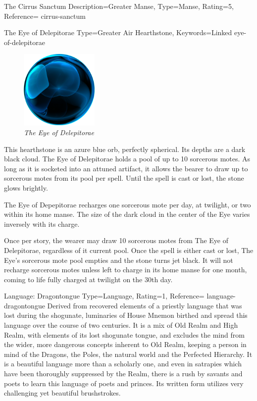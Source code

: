 \begin{Merit}{The Cirrus Sanctum}{%
    Description=Greater Manse,
    Type=Manse,
    Rating=5,
    Reference=\cite*[p.~163]{ex3}
}{cirrus-sanctum}
    \begin{Hearthstone}{The Eye of Delepitorae}{%
        Type=Greater Air Hearthstone,
        Keywords=Linked
    }{eye-of-delepitorae}
        \begin{figure}[b]
            \centering
            \includegraphics[height=1.5in]{Hearthstone.png}
            \caption*{\itshape The Eye of Delepitorae}
        \end{figure}
        This hearthstone is an azure blue orb, perfectly spherical. Its depths
        are a dark black cloud. The Eye of Delepitorae holds a pool of up to 10
        sorcerous motes. As long as it is socketed into an attuned artifact,
        it allows the bearer to draw up to  sorcerous
        motes from its pool per spell. Until the spell is cast or lost, the
        stone glows brightly.

        The Eye of Depepitorae recharges one sorcerous mote per day, at twilight,
        or two within its home manse. The size of the dark cloud in the center
        of the Eye varies inversely with its charge.

        Once per story, the wearer may draw 10 sorcerous motes from The Eye of
        Delepitorae, regardless of it current pool. Once the spell is either cast
        or lost, The Eye's sorcerous mote pool empties and the stone turns jet
        black. It will not recharge sorcerous motes unless left to charge in
        its home manse for one month, coming to life fully charged at twilight
        on the 30th day.
    \end{Hearthstone}
\end{Merit}


\begin{Merit}{Language: Dragontongue}{%
    Type=Language,
    Rating=1,
    Reference=\cite*[p.~162]{ex3}
}{language-dragontongue}
    Derived from recovered elements of a priestly language that was lost during
    the shogunate, luminaries of House Mnemon birthed and spread this language
    over the course of two centuries. It is a mix of Old Realm and High Realm,
    with elements of its lost shogunate tongue, and excludes the mind from the
    wider, more dangerous concepts inherent to Old Realm, keeping a person in
    mind of the Dragons, the Poles, the natural world and the Perfected
    Hierarchy. It is a beautiful language more than a scholarly one, and even
    in satrapies which have been thoroughly suppressed by the Realm, there is a
    rush by savants and poets to learn this language of poets and princes. Its
    written form utilizes very challenging yet beautiful brushstrokes.
\end{Merit}



